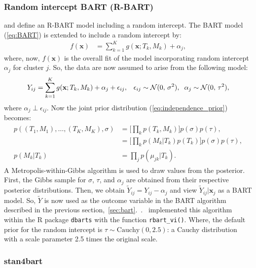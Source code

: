 \documentclass[3p,12pt,a4paper]{elsarticle}
\begin{document}
\subsubsection{Random intercept BART (R-BART)}
\citet{wagner2020,tan2016} and \citet{dorie2024} define an R-BART model including a random intercept. The BART model (\ref{eq:BART}) is extended to include a random intercept by: 
\begin{align} 
    \label{eq:R-BART}
    f(\textbf{x}) &= \sum^{K}_{k=1}g(\textbf{x}; T_{k}, M_{k}) + \alpha_{j}, 
\end{align} where, now, $f(\textbf{x})$ is the overall fit of the model incorporating random intercept $\alpha_{j}$ for cluster $j$. So, the data are now assumed to arise from the following model: 
\begin{align}
    \label{eq:R-BART_model}
    Y_{ij} = \sum^{K}_{k=1}g(\textbf{x}; T_{k}, M_{k}) + \alpha_j + \epsilon_{ij}, & &\epsilon_{ij} \sim \mathcal{N}(0,\,\sigma^{2}), \hspace{.2cm} \alpha_{j} \sim \mathcal{N}(0,\,\tau^{2}),
\end{align} where $\alpha_j \perp \epsilon_{ij}$. Now the joint prior distribution (\ref{eq:independence_prior}) becomes: 
\begin{align}
\begin{split}
    \label{eq:indepdence_prior_rbart}
    p((T_1, M_1), \dots, (T_K, M_K), \sigma) &= \Big[\prod_{k}p(T_k, M_k)\Big]p(\sigma)p(\tau), \\
    &= \Big[\prod_{k}p(M_k|T_k)p(T_k)\Big]p(\sigma)p(\tau), \\
    p(M_k|T_k) &= \prod_{j}p(\mu_{jk}|T_k).
\end{split}
\end{align} 
A Metropolis-within-Gibbs algorithm is used to draw values from the posterior. First, the Gibbs sample for $\sigma$, $\tau$, and $\alpha_j$ are obtained from their respective posterior distributions. Then, we obtain $\tilde{Y}_{ij} = Y_{ij} - \alpha_{j}$ and view $\tilde{Y}_{ij}| \boldsymbol{x}_{j}$ as a BART model. So, $\tilde{Y}$ is now used as the outcome variable in the BART algorithm described in the previous section,~\ref{sec:bart}.~\citep{wagner2020,tan2016}.~\citet{dorie2024} implemented this algorithm within the R package \texttt{dbarts} with the function \texttt{rbart\_vi()}. Where, the default prior for the random intercept is $\tau \sim \text{Cauchy}(0, 2.5)$: a Cauchy distribution with a scale parameter 2.5 times the original scale.

\subsubsection{stan4bart}
\end{document}
